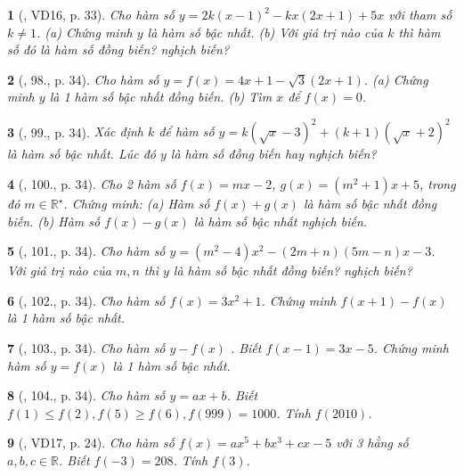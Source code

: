 \documentclass{article}
\newtheorem{baitoan}{}
\begin{document}
\begin{baitoan}[\cite{Tuyen_Toan_9_old}, VD16, p. 33]
	Cho hàm số $y = 2k(x - 1)^2 - kx(2x + 1) + 5x$ với tham số $k\ne1$. (a) Chứng minh $y$ là hàm số bậc nhất. (b) Với giá trị nào của $k$ thì hàm số đó là hàm số đồng biến? nghịch biến?
\end{baitoan}

\begin{baitoan}[\cite{Tuyen_Toan_9_old}, 98., p. 34]
	Cho hàm số $y = f(x) = 4x + 1 - \sqrt{3}(2x + 1)$. (a) Chứng minh $y$ là 1 hàm số bậc nhất đồng biến. (b) Tìm $x$ để $f(x) = 0$.
\end{baitoan}

\begin{baitoan}[\cite{Tuyen_Toan_9_old}, 99., p. 34]
	Xác định $k$ để hàm số $y = k(\sqrt{x} - 3)^2 + (k + 1)(\sqrt{x} + 2)^2$ là hàm số bậc nhất. Lúc đó $y$ là hàm số đồng biến hay nghịch biến?
\end{baitoan}

\begin{baitoan}[\cite{Tuyen_Toan_9_old}, 100., p. 34]
	Cho 2 hàm số $f(x) = mx - 2$, $g(x) = (m^2 + 1)x + 5$, trong đó $m\in\mathbb{R}^\star$. Chứng minh: (a) Hàm số $f(x) + g(x)$ là hàm số bậc nhất đồng biến. (b) Hàm số $f(x) - g(x)$ là hàm số bậc nhất nghịch biến. 
\end{baitoan}

\begin{baitoan}[\cite{Tuyen_Toan_9_old}, 101., p. 34]
	Cho hàm số $y = (m^2 - 4)x^2 - (2m + n)(5m - n)x - 3$. Với giá trị nào của $m,n$ thì $y$ là hàm số bậc nhất đồng biến? nghịch biến?
\end{baitoan}

\begin{baitoan}[\cite{Tuyen_Toan_9_old}, 102., p. 34]
	Cho hàm số $f(x) = 3x^2 + 1$. Chứng minh $f(x + 1) - f(x)$ là 1 hàm số bậc nhất.
\end{baitoan}

\begin{baitoan}[\cite{Tuyen_Toan_9_old}, 103., p. 34]
	Cho hàm số $y - f(x)$ . Biết $f(x - 1) = 3x - 5$. Chứng minh hàm số $y = f(x)$ là 1 hàm số bậc nhất.
\end{baitoan}

\begin{baitoan}[\cite{Tuyen_Toan_9_old}, 104., p. 34]
	Cho hàm số $y = ax + b$. Biết $f(1)\le f(2),f(5)\ge f(6),f(999) = 1000$. Tính $f(2010)$.
\end{baitoan}

\begin{baitoan}[\cite{Binh_Toan_9_tap_1}, VD17, p. 24]
	Cho hàm số $f(x) = ax^5 + bx^3 + cx - 5$ với 3 hằng số $a,b,c\in\mathbb{R}$. Biết $f(-3) = 208$. Tính $f(3)$.
\end{baitoan}
\end{document}
